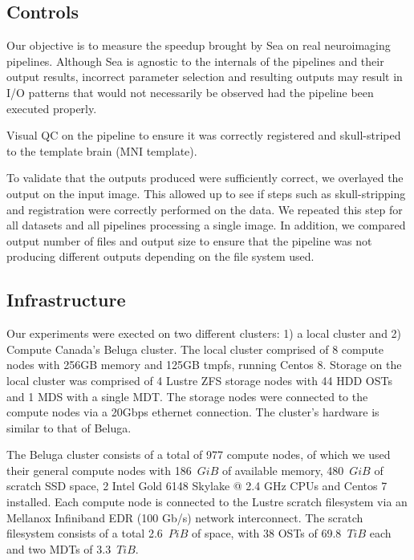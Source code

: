     \subsection{Controls}
    Our objective is to measure the speedup brought by Sea on real neuroimaging pipelines.
    Although Sea is agnostic to the internals of the pipelines and their output results, incorrect parameter
    selection and resulting outputs may result in I/O patterns that would not necessarily be observed had the
    pipeline been executed properly.
    
    Visual QC on the pipeline to ensure it was correctly registered and skull-striped to the template brain (MNI template). 
    
    To validate that the outputs produced were sufficiently correct, we overlayed the output on the input image.
    This allowed up to see if steps such as skull-stripping and registration were correctly performed on the data.
    We repeated this step for all datasets and all pipelines processing a single image. In addition, we compared output
    number of files and output size to ensure that the pipeline was not producing different outputs depending on the file
    system used.
    
    
    \subsection{Infrastructure}
    
    Our experiments were exected on two different clusters: 1) a local cluster and 2) Compute Canada's Beluga cluster.
    The local cluster comprised of 8 compute nodes with 256GB memory and 125GB tmpfs, running Centos 8. Storage on the local
    cluster was comprised of 4 Lustre ZFS storage nodes with 44 HDD OSTs and 1 MDS with a single MDT. The
    storage nodes were connected to the compute nodes via a 20Gbps ethernet connection.
    The cluster's hardware is similar to that of Beluga.
    
    The Beluga cluster consists of a total of 977 compute nodes, of which we used their general compute nodes with 186~$GiB$ of available
    memory, 480~$GiB$ of scratch SSD space, 2 Intel Gold 6148 Skylake @ 2.4 GHz CPUs and Centos 7 installed. Each compute node is connected
    to the Lustre scratch filesystem via an Mellanox Infiniband EDR (100 Gb/s) network interconnect. The scratch filesystem consists of a total 2.6~$PiB$
    of space, with 38 OSTs of 69.8~$TiB$ each and two MDTs of 3.3~$TiB$.


